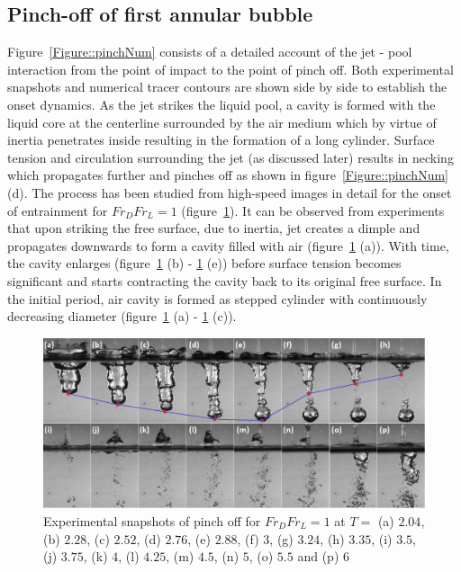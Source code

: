 \subsection{Pinch-off of first annular bubble}
Figure~\ref{Figure::pinchNum} consists of a detailed account of the jet - pool interaction from the point of impact to the point of pinch off. Both experimental snapshots and numerical tracer contours are shown side by side to establish the onset dynamics. As the jet strikes the liquid pool, a cavity is formed with the liquid core at the centerline surrounded by the air medium which by virtue of inertia penetrates inside resulting in the formation of a long cylinder. Surface tension and circulation surrounding the jet (as discussed later) results in necking which propagates further and pinches off as shown in figure~\ref{Figure::pinchNum} (d). The process has been studied from high-speed images in detail for the onset of entrainment for $Fr_DFr_L = 1$ (figure~\ref{Figure::pinchex}). It can be observed from experiments that upon striking the free surface, due to inertia, jet creates a dimple and propagates downwards to form a cavity filled with air (figure~\ref{Figure::pinchex} (a)). With time, the cavity enlarges (figure~\ref{Figure::pinchex} (b) - \ref{Figure::pinchex} (e)) before surface tension becomes significant and starts contracting the cavity back to its original free surface. In the initial period, air cavity is formed as stepped cylinder with continuously decreasing diameter (figure~\ref{Figure::pinchex} (a) - \ref{Figure::pinchex} (c)). \\
\begin{figure}
	\centering
	\includegraphics[width=\linewidth]{chapters/jetPool/Figure10}
	\caption{Experimental snapshots of pinch off for $Fr_DFr_L = 1$  at $T = $ (a) $2.04$, (b) $2.28$, (c) $2.52$, (d) $2.76$, (e) $2.88$, (f) $3$, (g) $3.24$, (h) $3.35$, (i) $3.5$, (j) $3.75$, (k) $4$, (l) $4.25$, (m) $4.5$, (n) $5$, (o) $5.5$ and (p) $6$}
	\label{Figure::pinchex}
\end{figure}
